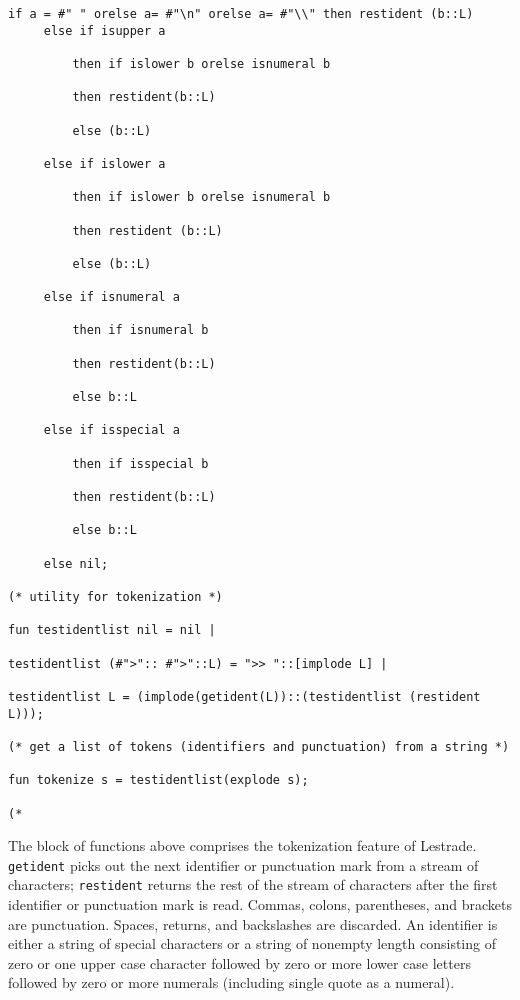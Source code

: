 \documentclass{article}
\begin{document}
\begin{verbatim}
if a = #" " orelse a= #"\n" orelse a= #"\\" then restident (b::L)
     else if isupper a

         then if islower b orelse isnumeral b

         then restident(b::L)

         else (b::L)

     else if islower a

         then if islower b orelse isnumeral b

         then restident (b::L)

         else (b::L)

     else if isnumeral a

         then if isnumeral b

         then restident(b::L)

         else b::L

     else if isspecial a

         then if isspecial b

         then restident(b::L)

         else b::L

     else nil;

(* utility for tokenization *)

fun testidentlist nil = nil |

testidentlist (#">":: #">"::L) = ">> "::[implode L] |

testidentlist L = (implode(getident(L))::(testidentlist (restident L)));

(* get a list of tokens (identifiers and punctuation) from a string *)

fun tokenize s = testidentlist(explode s);

(*

\end{verbatim}

The block of functions above comprises the tokenization feature of Lestrade.  {\tt getident} picks out the next identifier or punctuation mark from a stream of characters; {\tt restident} returns the rest of the stream of characters after the first identifier or punctuation mark is read.   Commas, colons, parentheses, and brackets are punctuation.  Spaces, returns, and backslashes are discarded.   An identifier is either a string of special characters or a string of nonempty length consisting of zero or one upper case character followed by zero or more lower case letters followed by zero or more numerals (including single quote as a numeral).
\end{document}

